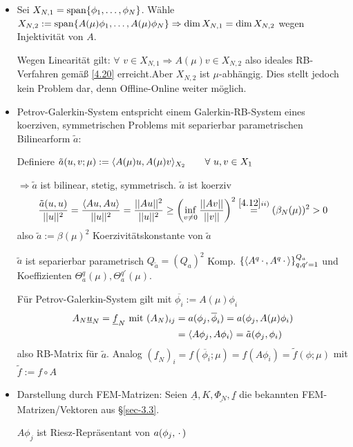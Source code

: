 \begin{bem} \beginwithlistbem
	\begin{itemize}
		\item Sei $X_{N,1} = \op{span}\{\phi_1,\dots,\phi_N\}$. Wähle $X_{N,2} := \op{span} \{A(\mu) \phi_1,\dots,A(\mu)\phi_N\} \Rightarrow \dim X_{N,1} = \dim X_{N,2}$ wegen Injektivität von $A$.
		
		Wegen Linearität gilt: $\forall \,\, v \in X_{N,1} \Rightarrow A(\mu)v \in X_{N,2}$ also ideales RB-Verfahren gemäß \ref{4.20} erreicht.Aber $X_{N,2}$ ist $\mu$-abhängig. Dies stellt jedoch kein Problem dar, denn Offline-Online weiter möglich.
		\item Petrov-Galerkin-System entspricht einem Galerkin-RB-System eines koerziven, symmetrischen Problems mit separierbar parametrischen Bilinearform $\tilde{a}$:
		
		Definiere $\tilde{a}(u,v;\mu) := \langle A(\mu)u, A(\mu)v \rangle_{X_2} \qquad \forall \,\, u,v \in X_1$
		
		$\Rightarrow \tilde{a}$ ist bilinear, stetig, symmetrisch. $\tilde{a}$ ist koerziv
		\[
			\frac{\tilde{a}(u,u)}{||u||^2} = \frac{\langle Au, Au \rangle}{||u||^2} = \frac{||Au||^2}{||u||^2} \geq \left(\inf\limits_{v \neq 0} \frac{||Av||}{||v||} \right)^2 \overset{\ref{4.12} ii)}{=} (\beta_N(\mu))^2 > 0
		\]
		also $\tilde{a} := \beta(\mu)^2$ Koerzivitätskonstante von $\tilde{a}$
		
		$\tilde{a}$ ist separierbar parametrisch $Q_{\tilde{a}} = (Q_a)^2$ Komp.  $\{\langle A^q\,\cdot\,, A^q\,\cdot\, \rangle\}_{q,q' =1}^{Q_a}$ und Koeffizienten $\Theta_a^q(\mu), \Theta_a^{q'}(\mu)$.
		
		Für Petrov-Galerkin-System gilt mit $\overline{\phi_i} := A(\mu) \phi_i$
		\begin{align*}
		A_N \underline{u}_N = \underline{f}_N \text{ mit } (A_N)_{ij} &= a(\phi_j,\overline{\phi}_i) = a(\phi_j, A(\mu)\phi_i) \\
		&= \dotp{A\phi_j}{A\phi_i} = \tilde{a} (\phi_j,\phi_i)
		\end{align*}
		also RB-Matrix für $\tilde{a}$. Analog $(\underline{f}_N)_i = f(\overline{\phi}_i;\mu) = f(A\phi_i) = \tilde{f}(\phi;\mu)$ mit $\tilde{f} := f \circ A$
		\item Darstellung durch FEM-Matrizen: Seien $\underline{A}, K, \underline{\Phi_N}, \underline{f}$ die bekannten FEM-Matrizen/Vektoren aus §\ref{sec-3.3}.
		
		$A\phi_j$ ist Riesz-Repräsentant von $a(\phi_j,\pdot)$
		

\end{itemize}
\end{bem}
